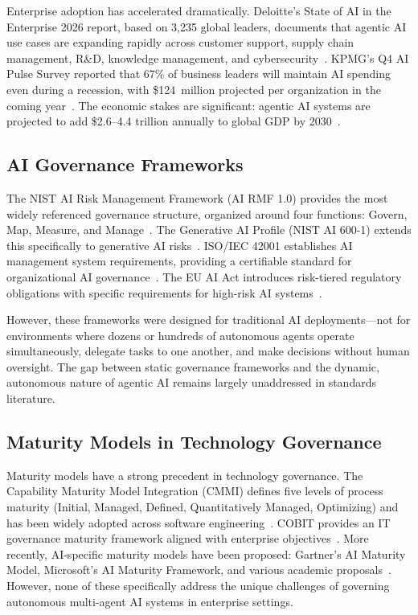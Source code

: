 \documentclass[ai,article,submit,pdftex,moreauthors]{Definitions/mdpi}
\begin{document}
Enterprise adoption has accelerated dramatically. Deloitte's State of AI in the Enterprise 2026 report, based on 3,235 global leaders, documents that agentic AI use cases are expanding rapidly across customer support, supply chain management, R\&D, knowledge management, and cybersecurity~\cite{deloitte2026state}. KPMG's Q4 AI Pulse Survey reported that 67\% of business leaders will maintain AI spending even during a recession, with \$124~million projected per organization in the coming year~\cite{kpmg2026q4pulse}. The economic stakes are significant: agentic AI systems are projected to add \$2.6--4.4 trillion annually to global GDP by 2030~\cite{arcade2025trends}.

\subsection{AI Governance Frameworks}\label{sec:related-governance}

The NIST AI Risk Management Framework (AI RMF 1.0) provides the most widely referenced governance structure, organized around four functions: Govern, Map, Measure, and Manage~\cite{nist2023rmf}. The Generative AI Profile (NIST AI 600-1) extends this specifically to generative AI risks~\cite{nist2024genai}. ISO/IEC 42001 establishes AI management system requirements, providing a certifiable standard for organizational AI governance~\cite{iso42001}. The EU AI Act introduces risk-tiered regulatory obligations with specific requirements for high-risk AI systems~\cite{euaiact2024}.

However, these frameworks were designed for traditional AI deployments---not for environments where dozens or hundreds of autonomous agents operate simultaneously, delegate tasks to one another, and make decisions without human oversight. The gap between static governance frameworks and the dynamic, autonomous nature of agentic AI remains largely unaddressed in standards literature.

\subsection{Maturity Models in Technology Governance}\label{sec:related-maturity}

Maturity models have a strong precedent in technology governance. The Capability Maturity Model Integration (CMMI) defines five levels of process maturity (Initial, Managed, Defined, Quantitatively Managed, Optimizing) and has been widely adopted across software engineering~\cite{cmmi2018}. COBIT provides an IT governance maturity framework aligned with enterprise objectives~\cite{cobit2019}. More recently, AI-specific maturity models have been proposed: Gartner's AI Maturity Model, Microsoft's AI Maturity Framework, and various academic proposals~\cite{gartner2024aimaturity,microsoft2024aimaturity}. However, none of these specifically address the unique challenges of governing autonomous multi-agent AI systems in enterprise settings.
\end{document}
